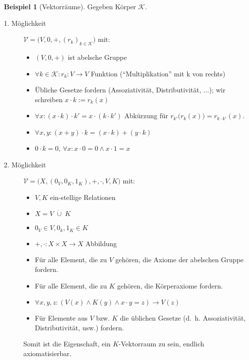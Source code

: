 \documentclass{article}
\theoremstyle{definition}
\newtheorem*{bsp}{Beispiel}
\theoremstyle{plain}
\newcommand{\m}[1]{\mathcal{#1}}
\begin{document}
    \begin{bsp}[Vektorräume]
        Gegeben Körper $ \m{K} $.
        \begin{description}
            \item[1. Möglichkeit]
            $ \m{V} = \big(V, 0, +, (r_k)_{k \in \m{K}} \big) $ mit:
            \begin{itemize}
                \item $ (V, 0, +) $ ist abelsche Gruppe
                \item $ \forall k \in \m{K}: r_k : V \rightarrow V $ Funktion (``Multiplikation'' mit k von rechts)
                \item Übliche Gesetze fordern (Assoziativität, Distributivität, ...); wir schreiben $ x \cdot k := r_k(x) $
                \item $ \forall x: (x \cdot k) \cdot k' = x \cdot (k \cdot k') $ Abkürzung für $ r_{k'}\big(r_k(x)\big) = r_{k \cdot k'}(x) $.
                \item $ \forall x, y: (x + y ) \cdot k = (x \cdot k) + (y \cdot k) $
                \item $ 0 \cdot k = 0 $, $ \forall x: x \cdot 0 = 0 \land x \cdot 1 = x $
            \end{itemize}

            \item[2. Möglichkeit]
            $ \m{V} = \big(X, (0_V, 0_K, 1_K), +, \cdot, V, K\big) $ mit:
            \begin{itemize}
                \item $ V , K $ ein-stellige Relationen
                \item $ X = V \; \dot\cup \; K $
                \item $ 0_V \in V, 0_k, 1_K \in K $
                \item $ +, \cdot : X \times X \rightarrow X $ Abbildung
                \item Für alle Element, die zu $ V $ gehören, die Axiome der abelschen Gruppe fordern.
                \item Für alle Element, die zu $ K $ gehören, die Körperaxiome fordern.
                \item $ \forall x, y, z: (V(x) \land K(y) \land x \cdot y = z) \rightarrow V(z) $
                \item Für Elemente aus $ V $ bzw. $ K $ die üblichen Gesetze (d.~h. Assoziativität, Distributivität, usw.) fordern.
            \end{itemize}
            Somit ist die Eigenschaft, ein $ K $-Vektorraum zu sein, endlich axiomatisierbar.


\end{description}
\end{bsp}
\end{document}

